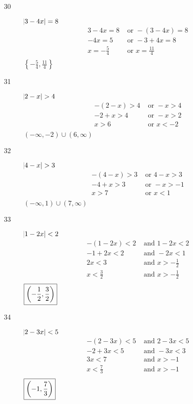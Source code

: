 \documentclass[letterpaper, landscape]{exam}
\begin{document}
    \begin{description}

      \item[30]
        $\abs{ 3 - 4x } = 8$
        \begin{align*}
          3 - 4x = 8        & \text{ or } -(3 - 4x) = 8 \\
           -4x = 5          & \text{ or } -3 + 4x = 8 \\
           x = -\frac{5}{4} & \text{ or } x = \frac{11}{4} \\
        \end{align*}
        $\boxed{ \left\{- \frac{5}{4}, \frac{11}{4} \right\} }$

      \item[31]
        $ \abs{ 2 - x } > 4$
        \begin{align*}
          -(2 - x) > 4 & \text{ or } - x > 4 \\
          -2 + x > 4   & \text{ or } -x > 2 \\
          x > 6        & \text{ or } x < -2 \\
        \end{align*}
        $\boxed{ (-\infty, -2) \cup (6, \infty) }$

      \item[32]
        $\abs{ 4 - x } > 3$
        \begin{align*}
          -(4 - x) > 3 & \text{ or } 4 - x > 3 \\
          -4 + x > 3   & \text{ or } -x > -1 \\
          x > 7        & \text{ or } x < 1 \\
        \end{align*}
        $\boxed{ (-\infty, 1) \cup (7, \infty) }$

      \item[33]
        $\abs{ 1 - 2x } < 2$
        \begin{align*}
          -(1 - 2x) < 2   & \text{ and } 1 - 2x < 2 \\
          -1 + 2x < 2     & \text{ and } -2x < 1 \\
          2x < 3          & \text{ and } x > - \frac{1}{2} \\
          x < \frac{3}{2} & \text{ and } x > - \frac{1}{2} \\
        \end{align*}
        $\boxed{ \del{ - \frac{1}{2}, \frac{3}{2} } }$

      \item[34]
        $\abs{ 2 - 3x } < 5$
        \begin{align*}
          -(2 - 3x) < 5   & \text{ and } 2 - 3x < 5 \\
          -2 + 3x < 5     & \text{ and } -3x < 3 \\
          3x < 7          & \text{ and } x > -1 \\
          x < \frac{7}{3} & \text{ and } x > -1 \\
        \end{align*}
        $\boxed{ \del{ -1, \frac{7}{3} } }$


\end{description}
\end{document}
